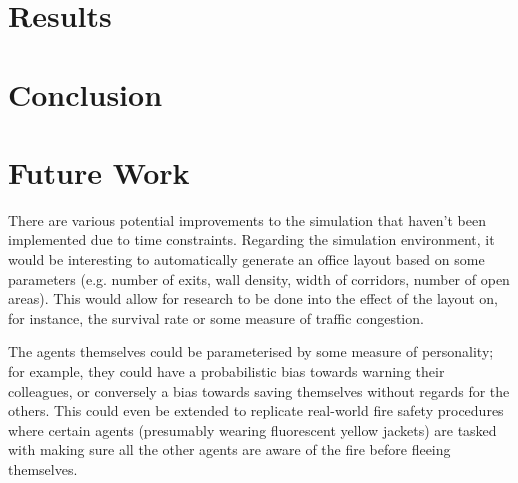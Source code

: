 \documentclass[a4paper]{article}
\begin{document}
\section{Results}

\section{Conclusion}

\section{Future Work}
There are various potential improvements to the simulation that haven't been
implemented due to time constraints. Regarding the simulation environment, it
would be interesting to automatically generate an office layout based on some
parameters (e.g. number of exits, wall density, width of corridors, number of
open areas). This would allow for research to be done into the effect of the
layout on, for instance, the survival rate or some measure of traffic congestion.

The agents themselves could be parameterised by some measure of personality; for
example, they could have a probabilistic bias towards warning their colleagues,
or conversely a bias towards saving themselves without regards for the others.
This could even be extended to replicate real-world fire safety procedures where
certain agents (presumably wearing fluorescent yellow jackets) are tasked with
making sure all the other agents are aware of the fire before fleeing themselves.
\end{document}

